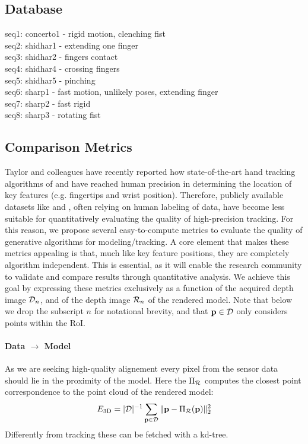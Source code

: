 \clearpage



\subsection{Database}
seq1: concerto1 - rigid motion, clenching fist \\
seq2: shidhar1 - extending one finger \\
seq3: shidhar2 - fingers contact \\
seq4: shidhar4 - crossing fingers \\ 
seq5: shidhar5 - pinching \\
seq6: sharp1 - fast motion, unlikely poses, extending finger \\ 
seq7: sharp2 - fast rigid  \\
seq8: sharp3 - rotating fist


\subsection{Comparison Metrics}
Taylor and colleagues  have recently reported how state-of-the-art hand tracking algorithms of \cite{sharp2015accurate} and \cite{tagliasacchi2015robust} have reached human precision in determining the location of key features (e.g. fingertips and wrist position). Therefore, publicly available datasets like \cite{tompson2014real} and \cite{sridhar2013multicam}, often relying on human labeling of data, have become less suitable for quantitatively evaluating the quality of high-precision tracking. 
% 
For this reason, we propose several easy-to-compute metrics to evaluate the quality of generative algorithms for modeling/tracking. A core element that makes these metrics appealing is that, much like key feature positions, they are completely algorithm independent. This is essential, as it will enable the research community to validate and compare results through quantitative analysis. 
% 
We achieve this goal by expressing these metrics exclusively as a function of the acquired depth image $\mathcal{D}_n$, and of the depth image $\mathcal{R}_{n}$ of the rendered model. Note that below we drop the subscript $n$ for notational brevity, and that $\mathbf{p} \in \mathcal{D}$ only considers points within the RoI. 




\paragraph{Data $\rightarrow$ Model}
As we are seeking high-quality alignement every pixel from the sensor data should lie in the proximity of the model. Here the $\Pi_{\mathcal{R}}$ computes the closest point correspondence to the point cloud of the rendered model:
% 
\begin{equation}
E_\text{3D} = |\mathcal{D}|^{-1} \sum_{\mathbf{p} \in \mathcal{D}} \| \mathbf{p} - \Pi_{\mathcal{R}}(\mathbf{p}) \|_2^2
\label{eq:metric1}
\end{equation}
% 
Differently from tracking these can be fetched with a kd-tree.

